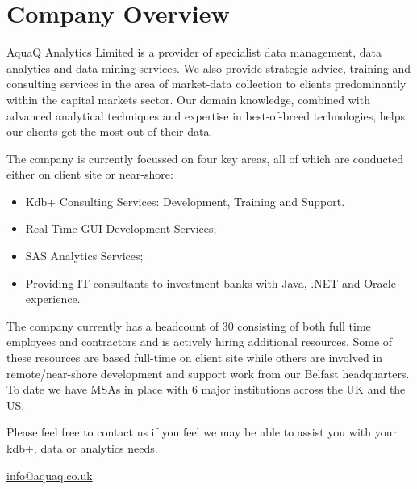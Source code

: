 \chapter{Company Overview}

AquaQ Analytics Limited is a provider of specialist data management, data analytics and data mining services. We also provide strategic advice, training and consulting services in the area of market-data collection to clients predominantly within the capital markets sector. Our domain knowledge, combined with advanced analytical techniques and expertise in best-of-breed technologies, helps our clients get the most out of their data.

The company is currently focussed on four key areas, all of which are conducted either on client site or near-shore:
\begin{itemize}
\item Kdb+ Consulting Services: Development, Training and Support.
\item Real Time GUI Development Services;
\item SAS Analytics Services;
\item Providing IT consultants to investment banks with Java, .NET and Oracle experience.
\end{itemize} 

The company currently has a headcount of 30 consisting of both full time employees and contractors and is actively hiring additional resources. Some of these resources are based full-time on client site while others are involved in remote/near-shore development and support work from our Belfast headquarters. To date we have MSAs in place with 6 major institutions across the UK and the US.

Please feel free to contact us if you feel we may be able to assist you with your kdb+, data or analytics needs. 

\begin{center}
\href{mailto:info@aquaq.co.uk}{info@aquaq.co.uk}
\end{center}
